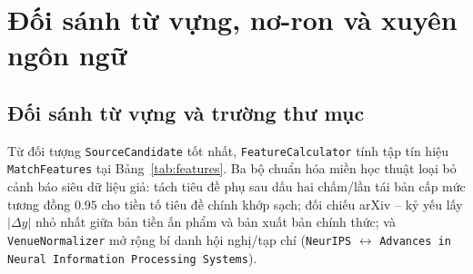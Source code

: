 \section{Đối sánh từ vựng, nơ-ron và xuyên ngôn ngữ}

\subsection{Đối sánh từ vựng và trường thư mục}

Từ đối tượng \texttt{SourceCandidate} tốt nhất, \texttt{FeatureCalculator} tính tập tín hiệu \texttt{MatchFeatures} tại Bảng~\ref{tab:features}. Ba bộ chuẩn hóa miền học thuật loại bỏ cảnh báo siêu dữ liệu giả: tách tiêu đề phụ sau dấu hai chấm/lần tái bản cấp mức tương đồng $0.95$ cho tiền tố tiêu đề chính khớp sạch; đối chiếu arXiv -- kỷ yếu lấy $|\Delta y|$ nhỏ nhất giữa bản tiền ấn phẩm và bản xuất bản chính thức; và \texttt{VenueNormalizer} mở rộng bí danh hội nghị/tạp chí (\texttt{NeurIPS} $\leftrightarrow$ \texttt{Advances in Neural Information Processing Systems}).

